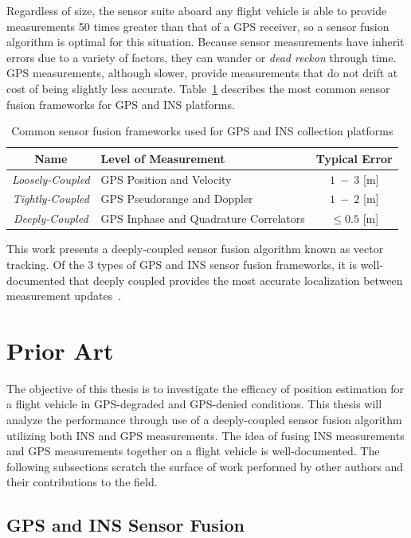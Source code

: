 \documentclass[12pt]{report}
\begin{document}
Regardless of size, the sensor suite aboard any flight vehicle is able to provide measurements 50 times greater than that of a GPS receiver, so a sensor fusion algorithm is optimal for this situation. Because sensor measurements have inherit errors due to a variety of factors, they can wander or \textit{dead reckon} through time. GPS measurements, although slower, provide measurements that do not drift at cost of being slightly less accurate. Table~\ref{tbl:sensorfusionframeworks} describes the most common sensor fusion frameworks for GPS and INS platforms.
\begin{table}[!ht]\label{tbl:sensorfusionframeworks}
  \caption{Common sensor fusion frameworks used for GPS and INS collection platforms}
  \centering
  \begin{tabular}{clc}
    \toprule
    \textbf{Name}            & \textbf{Level of Measurement}          & \textbf{Typical Error} \\
    \midrule
    \textit{Loosely-Coupled} & GPS Position and Velocity              & \(1~-~3\) [m]          \\
    \textit{Tightly-Coupled} & GPS Pseudorange and Doppler            & \(1~-~2\) [m]          \\
    \textit{Deeply-Coupled}  & GPS Inphase and Quadrature Correlators & \(\leq0.5\) [m]        \\
    \bottomrule
  \end{tabular}
\end{table}
This work presents a deeply-coupled sensor fusion algorithm known as vector tracking. Of the 3 types of GPS and INS sensor fusion frameworks, it is well-documented that deeply coupled provides the most accurate localization between measurement updates~\cite{wattsGPSGLONASSL12019}.
\section{Prior Art}
The objective of this thesis is to investigate the efficacy of position estimation for a flight vehicle in GPS-degraded and GPS-denied conditions. This thesis will analyze the performance through use of a deeply-coupled sensor fusion algorithm utilizing both INS and GPS measurements. The idea of fusing INS measurements and GPS measurements together on a flight vehicle is well-documented. The following subsections scratch the surface of work performed by other authors and their contributions to the field.
\subsection{GPS and INS Sensor Fusion}
\end{document}
